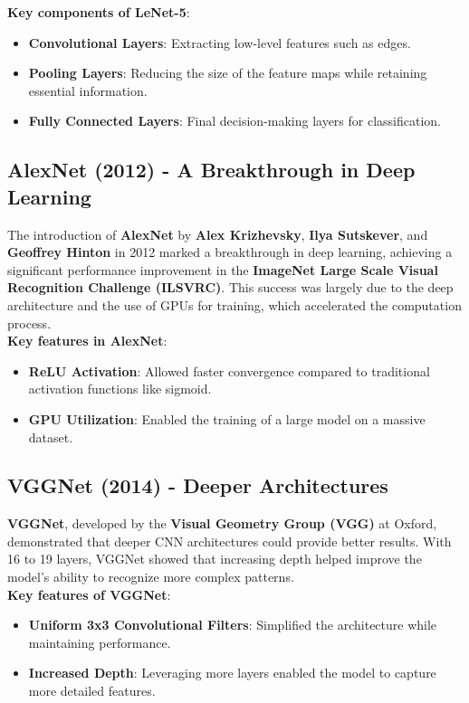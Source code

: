 \textbf{Key components of LeNet-5}:
\begin{itemize}
    \item \textbf{Convolutional Layers}: Extracting low-level features such as edges.
    \item \textbf{Pooling Layers}: Reducing the size of the feature maps while retaining essential information.
    \item \textbf{Fully Connected Layers}: Final decision-making layers for classification.
\end{itemize}

\subsection{AlexNet (2012) - A Breakthrough in Deep Learning}
The introduction of \textbf{AlexNet} by \textbf{Alex Krizhevsky}, \textbf{Ilya Sutskever}, and \textbf{Geoffrey Hinton} in 2012 marked a breakthrough in deep learning, achieving a significant performance improvement in the \textbf{ImageNet Large Scale Visual Recognition Challenge (ILSVRC)}. This success was largely due to the deep architecture and the use of GPUs for training, which accelerated the computation process.\cite{krizhevsky2012imagenet}\\

\textbf{Key features in AlexNet}:
\begin{itemize}
    \item \textbf{ReLU Activation}: Allowed faster convergence compared to traditional activation functions like sigmoid.
    \item \textbf{GPU Utilization}: Enabled the training of a large model on a massive dataset.
\end{itemize}

\subsection{VGGNet (2014) - Deeper Architectures}
\textbf{VGGNet}, developed by the \textbf{Visual Geometry Group (VGG)} at Oxford, demonstrated that deeper CNN architectures could provide better results. With 16 to 19 layers, VGGNet showed that increasing depth helped improve the model’s ability to recognize more complex patterns.\cite{simonyan2014very}\\

\textbf{Key features of VGGNet}:
\begin{itemize}
    \item \textbf{Uniform 3x3 Convolutional Filters}: Simplified the architecture while maintaining performance.
    \item \textbf{Increased Depth}: Leveraging more layers enabled the model to capture more detailed features.
\end{itemize}

